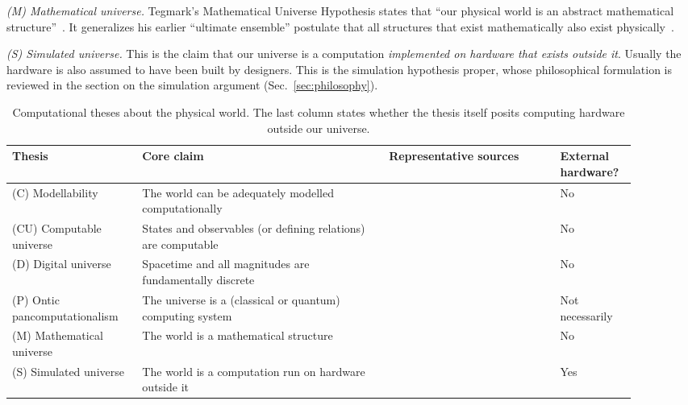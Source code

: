 \emph{(M) Mathematical universe.} Tegmark's Mathematical Universe Hypothesis
states that ``our physical world is an abstract mathematical
structure''~\cite{Tegmark2008mathematical}. It generalizes his earlier
``ultimate ensemble'' postulate that all structures that exist mathematically
also exist physically~\cite{Tegmark1998is}.

\emph{(S) Simulated universe.} This is the claim that our universe is a
computation \emph{implemented on hardware that exists outside it}. Usually the
hardware is also assumed to have been built by designers. This is the
simulation hypothesis proper, whose philosophical formulation is reviewed in
the section on the simulation argument (Sec.~\ref{sec:philosophy}).


\begin{table}[t]
\centering
\small
\caption{Computational theses about the physical world. The last column states
whether the thesis itself posits computing hardware outside our universe.}
\label{tab:digital-physics:theses}
\begin{tabular}{@{}p{0.19\linewidth}p{0.36\linewidth}p{0.25\linewidth}p{0.10\linewidth}@{}}
\hline
Thesis & Core claim & Representative sources & External hardware? \\
\hline
(C) Modellability & The world can be adequately modelled computationally & \cite{Floridi2009against} & No \\
(CU) Computable universe & States and observables (or defining relations) are computable & \cite{Szudzik2012computable,Tegmark2008mathematical,Deutsch1985quantum} & No \\
(D) Digital universe & Spacetime and all magnitudes are fundamentally discrete & \cite{Floridi2009against,Fredkin2003introduction} & No \\
(P) Ontic pancomputationalism & The universe is a (classical or quantum) computing system & \cite{Piccinini2025computation,Lloyd2002computational,Wolfram2002new} & Not necessarily \\
(M) Mathematical universe & The world is a mathematical structure & \cite{Tegmark2008mathematical} & No \\
(S) Simulated universe & The world is a computation run on hardware outside it & \cite{Moravec1992pigs,Bostrom2003are} & Yes \\
\hline
\end{tabular}
\end{table}

